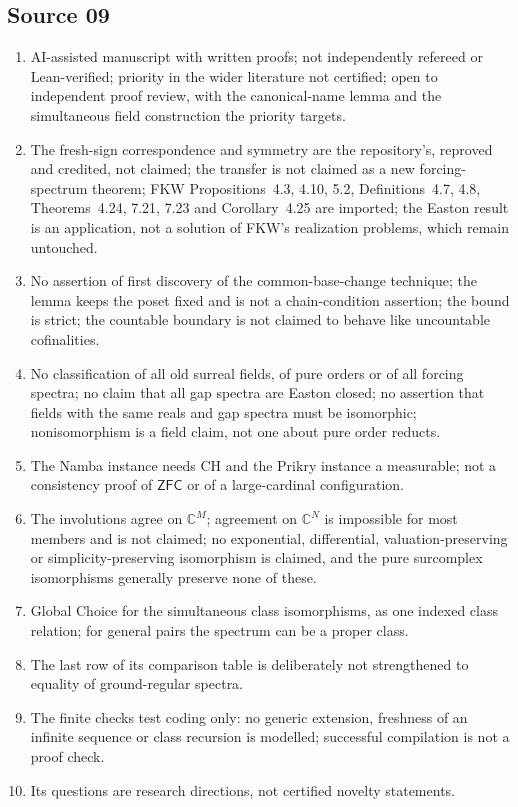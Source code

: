 \documentclass[11pt,letterpaper]{article}
\numberwithin{equation}{section}
\theoremstyle{definition}
\theoremstyle{remark}
\newcommand{\C}{\mathbb C}
\newcommand{\ZFC}{\mathsf{ZFC}}
\begin{document}
\subsection*{Source 09}
\begin{enumerate}[label=09.\arabic*,leftmargin=3.2em]
\item AI-assisted manuscript with written proofs; not independently refereed or Lean-verified;
priority in the wider literature not certified; open to independent proof review, with the
canonical-name lemma and the simultaneous field construction the priority targets.
\item The fresh-sign correspondence and symmetry are the repository's, reproved and credited, not
claimed; the transfer is not claimed as a new forcing-spectrum theorem; FKW Propositions~4.3, 4.10,
5.2, Definitions~4.7, 4.8, Theorems~4.24, 7.21, 7.23 and Corollary~4.25 are imported; the Easton
result is an application, not a solution of FKW's realization problems, which remain untouched.
\item No assertion of first discovery of the common-base-change technique; the lemma keeps the poset
fixed and is not a chain-condition assertion; the bound is strict; the countable boundary is not
claimed to behave like uncountable cofinalities.
\item No classification of all old surreal fields, of pure orders or of all forcing spectra; no claim
that all gap spectra are Easton closed; no assertion that fields with the same reals and gap spectra
must be isomorphic; nonisomorphism is a field claim, not one about pure order reducts.
\item The Namba instance needs CH and the Prikry instance a measurable; not a consistency proof of
$\ZFC$ or of a large-cardinal configuration.
\item The involutions agree on $\C^M$; agreement on $\C^N$ is impossible for most members and is not
claimed; no exponential, differential, valuation-preserving or simplicity-preserving isomorphism is
claimed, and the pure surcomplex isomorphisms generally preserve none of these.
\item Global Choice for the simultaneous class isomorphisms, as one indexed class relation; for
general pairs the spectrum can be a proper class.
\item The last row of its comparison table is deliberately not strengthened to equality of
ground-regular spectra.
\item The finite checks test coding only: no generic extension, freshness of an infinite sequence or
class recursion is modelled; successful compilation is not a proof check.
\item Its questions are research directions, not certified novelty statements.
\end{enumerate}
\end{document}
